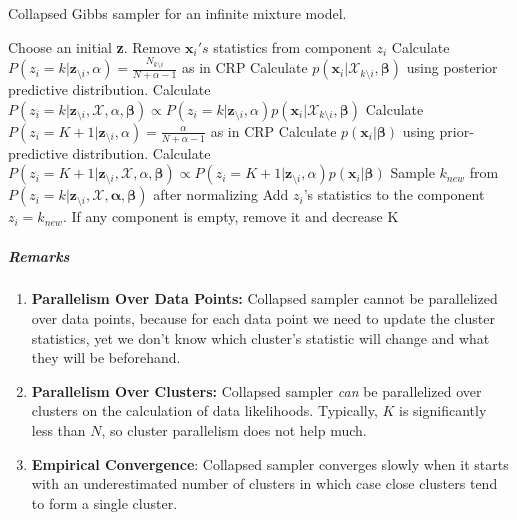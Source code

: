 \documentclass[12pt, a4paper]{article}
\begin{document}
\begin{algorithm}
  \caption{Collapsed Gibbs sampler for an infinite mixture model.}\label{collapsedgibbs}
  \begin{algorithmic}[1]
    
  \State Choose an initial \textbf{z}.
   
        \State Remove $\mathbf{x}_i's$ statistics from component $z_i$ 
         
            \State Calculate $P(z_i = k | \mathbf{z}_{\setminus i},\alpha) = \frac{N_{k\setminus i}}{N+\alpha-1}$ as in CRP
            \State Calculate $p(\mathbf{x}_i|\mathcal{X}_{k\setminus i},\mathbf{\beta})$ using posterior predictive distribution.
            \State Calculate $P(z_i = k | \mathbf{z}_{\setminus i},\mathcal{X},\alpha,\mathbf{\beta}) \propto P(z_i = k | \mathbf{z}_{\setminus i},\alpha) p(\mathbf{x}_i|\mathcal{X}_{k\setminus i}, \mathbf{\beta})$
        \EndFor
        \State Calculate $P(z_i = K+1 | \mathbf{z}_{\setminus i},\alpha) = \frac{\alpha}{N+\alpha-1}$ as in CRP 
        \State Calculate $p(\mathbf{x}_i|\mathbf{\beta})$ using prior-predictive distribution.
        \State Calculate $P(z_i = K+1 | \mathbf{z}_{\setminus i},\mathcal{X},\alpha, \mathbf{\beta}) \propto P(z_i = K+1 | \mathbf{z}_{\setminus i},\alpha)p(\mathbf{x}_i|\mathbf{\beta})$
        \State Sample $k_{new}$ from $P(z_i = k | \mathbf{z}_{\setminus i},\mathcal{X},\mathbf{\alpha},\mathbf{\beta})$ after normalizing
        \State Add $z_i$'s statistics to the component $z_i = k_{new}$.
        \State If any component is empty, remove it and decrease K
    \EndFor
  \EndFor
  \end{algorithmic}
\end{algorithm}


\subparagraph{Remarks}
\begin{enumerate}
   \item  \textbf{Parallelism Over Data Points:} Collapsed sampler cannot be parallelized over data points, because for each data point we need to update the cluster statistics, yet we don't know which cluster's statistic will change and what they will be beforehand.
   \item  \textbf{Parallelism Over Clusters:} Collapsed sampler \textit{can} be parallelized over clusters on the calculation of data likelihoods. Typically, $K$ is significantly less than $N$, so cluster parallelism does not help much.
   \item  \textbf{Empirical Convergence}:
  Collapsed sampler converges slowly when it starts with an underestimated
  number of clusters in which case close clusters tend to form a single cluster.
\end{enumerate}
\end{document}
